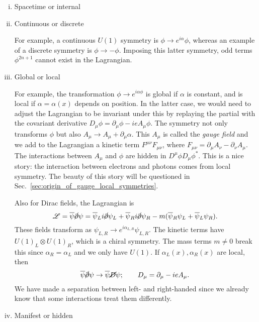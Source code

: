\begin{enumerate}[(i)]
  \item Spacetime or internal
  \item Continuous or discrete

    For example, a continuous $U(1)$ symmetry is $\phi \to e^{i \alpha} \phi$, whereas an example of a discrete symmetry is $\phi \to -\phi$.
    Imposing this latter symmetry, odd terms $\phi^{2n+1}$ cannot exist in the Lagrangian.
  \item Global or local

    For example, the transformation $\phi \to e^{i \alpha \phi}$ is global if $\alpha$ is constant, and is local if $\alpha = \alpha(x)$ depends on position.
    In the latter case, we would need to adjust the Lagrangian to be invariant under this by replaying the partial with the covariant derivative $D_{\mu} \phi = \partial_{\mu} \phi - i e A_{\mu} \phi$. The symmetry not only transforms $\phi$ but also $A_{\mu} \to A_{\mu} + \partial_{\mu} \alpha$.
    This $A_{\mu}$ is called the \emph{gauge field} and we add to the Lagrangian a kinetic term $F^{\mu\nu} F_{\mu\nu}$, where $F_{\mu\nu} = \partial_{\mu} A_{\nu} - \partial_{\nu} A_{\mu}$.
    The interactions between $A_{\mu}$ and $\phi$ are hidden in $D^{\mu} \phi D_{\mu} \phi^*$.
    This is a nice story: the interaction between electrons and photons comes from local symmetry. The beauty of this story will be questioned in Sec.~\ref{sec:origin_of_gauge_local_symmetries}.

    Also for Dirac fields, the Lagrangian is
    \begin{equation}
      \mathscr{L} = \overline{\psi}{}\cancel{\partial}\psi = \overline{\psi}{}_L i \cancel{\partial} \psi_L + \overline{\psi}{}_R i \cancel{\partial} \psi_R - m (\overline{\psi}{}_R \psi_L + \overline{\psi}{}_L \psi_R).
    \end{equation}
    These fields transform as $\psi_{L, R} \to e ^{i \alpha_{L, R}} \psi_{L, R}$.
    The kinetic terms have $U(1)_L \otimes U(1)_R$, which is a chiral symmetry.
    The mass terms $m \neq 0$ break this since $\alpha_R = \alpha_L$ and we only have $U(1)$.
    If $\alpha_L(x), \alpha_R(x)$ are local, then
    \begin{equation}
      \overline{\psi}{} \cancel{\partial} \psi \to \overline{\psi}{} \cancel{D} \psi; \qquad D_{\mu} = \partial_{\mu} - i e A_{\mu}.
    \end{equation}
    We have made a separation between left- and right-handed since we already know that some interactions treat them differently.
  \item Manifest or hidden


\end{enumerate}
